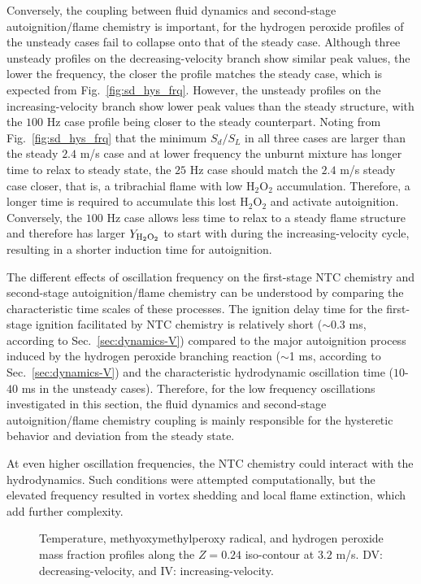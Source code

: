 Conversely, the coupling between fluid dynamics and second-stage autoignition/flame chemistry is important, for the hydrogen peroxide profiles of the unsteady cases fail to collapse onto that of the steady case.  Although three unsteady profiles on the decreasing-velocity branch show similar peak values, the lower the frequency, the closer the profile matches the steady case, which is expected from Fig.~\ref{fig:sd_hys_frq}.  However, the unsteady profiles on the increasing-velocity branch show lower peak values than the steady structure, with the $100$ Hz case profile being closer to the steady counterpart.  Noting from Fig.~\ref{fig:sd_hys_frq} that the minimum $S_d/S_L$ in all three cases are larger than the steady $2.4$ m/s case and at lower frequency the unburnt mixture has longer time to relax to steady state, the $25$ Hz case should match the $2.4$ m/s steady case closer, that is, a tribrachial flame with low H$_2$O$_2$ accumulation.  Therefore, a longer time is required to accumulate this lost H$_2$O$_2$ and activate autoignition.  Conversely, the $100$ Hz case allows less time to relax to a steady flame structure and therefore has larger $Y_{\rm H_2O_2}$ to start with during the increasing-velocity cycle, resulting in a shorter induction time for autoignition.

The different effects of oscillation frequency on the first-stage NTC chemistry and second-stage autoignition/flame chemistry can be understood by comparing the characteristic time scales of these processes.  The ignition delay time for the first-stage ignition facilitated by NTC chemistry is relatively short ($\sim$0.3 ms, according to Sec.~\ref{sec:dynamics-V}) compared to the major autoignition process induced by the hydrogen peroxide branching reaction ($\sim$1 ms, according to Sec.~\ref{sec:dynamics-V}) and the characteristic hydrodynamic oscillation time ($10$-$40$ ms in the unsteady cases).  Therefore, for the low frequency oscillations investigated in this section, the fluid dynamics and second-stage autoignition/flame chemistry coupling is mainly responsible for the hysteretic behavior and deviation from the steady state.

At even higher oscillation frequencies, the NTC chemistry could interact with the hydrodynamics.  Such conditions were attempted computationally, but the elevated frequency resulted in vortex shedding and local flame extinction, which add further complexity.

\begin{figure}[t]
  \centering
  \scriptsize
  \resizebox{0.8\textwidth}{!}{}
  \resizebox{0.8\textwidth}{!}{}
  \resizebox{0.8\textwidth}{!}{}
  \normalsize
  \caption{Temperature, methyoxymethylperoxy radical, and hydrogen peroxide mass fraction profiles along the $Z = 0.24$ iso-contour at $3.2$ m/s.  DV: decreasing-velocity, and IV: increasing-velocity.}
  \label{fig:ind_frq}
\end{figure}

